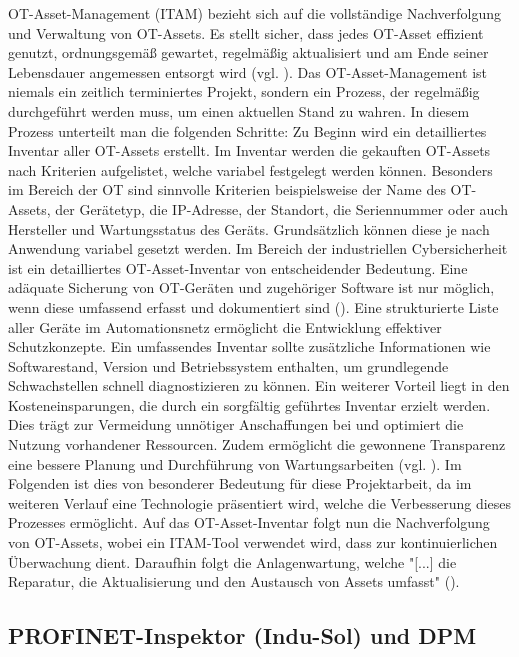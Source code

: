 OT-Asset-Management (ITAM) bezieht sich auf die vollständige Nachverfolgung und Verwaltung von OT-Assets. Es stellt sicher, dass jedes OT-Asset effizient genutzt, ordnungsgemäß gewartet, regelmäßig aktualisiert und am Ende seiner Lebensdauer angemessen entsorgt wird (vgl. \cite{IBM}). Das OT-Asset-Management ist niemals ein zeitlich terminiertes Projekt, sondern ein Prozess, der regelmäßig durchgeführt werden muss, um einen aktuellen Stand zu wahren. In diesem Prozess unterteilt man die folgenden Schritte: Zu Beginn wird ein detailliertes Inventar aller OT-Assets erstellt. Im Inventar werden die gekauften OT-Assets nach Kriterien aufgelistet, welche variabel festgelegt werden können. Besonders im Bereich der OT sind sinnvolle Kriterien beispielsweise der Name des OT-Assets, der Gerätetyp, die IP-Adresse, der Standort, die Seriennummer oder auch Hersteller und Wartungsstatus des Geräts. Grundsätzlich können diese je nach Anwendung variabel gesetzt werden. Im Bereich der industriellen Cybersicherheit ist ein detailliertes OT-Asset-Inventar von entscheidender Bedeutung. Eine adäquate Sicherung von OT-Geräten und zugehöriger Software ist nur möglich, wenn diese umfassend erfasst und dokumentiert sind (\cite{atlassian}). Eine strukturierte Liste aller Geräte im Automationsnetz ermöglicht die Entwicklung effektiver Schutzkonzepte. Ein umfassendes Inventar sollte zusätzliche Informationen wie Softwarestand, Version und Betriebssystem enthalten, um grundlegende Schwachstellen schnell diagnostizieren zu können. Ein weiterer Vorteil liegt in den Kosteneinsparungen, die durch ein sorgfältig geführtes Inventar erzielt werden. Dies trägt zur Vermeidung unnötiger Anschaffungen bei und optimiert die Nutzung vorhandener Ressourcen. Zudem ermöglicht die gewonnene Transparenz eine bessere Planung und Durchführung von Wartungsarbeiten (vgl. \cite{sichereIndustrie}). Im Folgenden ist dies von besonderer Bedeutung für diese Projektarbeit, da im weiteren Verlauf eine Technologie präsentiert wird, welche die Verbesserung dieses Prozesses ermöglicht. Auf das OT-Asset-Inventar folgt nun die Nachverfolgung von OT-Assets, wobei ein ITAM-Tool verwendet wird, dass zur kontinuierlichen Überwachung dient. Daraufhin folgt die Anlagenwartung, welche "[...] die Reparatur, die Aktualisierung und den Austausch von Assets umfasst" (\cite{IBM}).

\subsection{PROFINET-Inspektor (Indu-Sol) und DPM}

